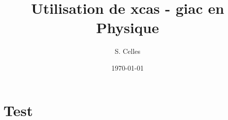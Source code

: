 \documentclass[a4paper,10pt]{book}
\title{Utilisation de xcas - giac en Physique}
\author{S. Celles}
\date{\today}
\begin{document}
\maketitle


\chapter{Test}
\end{document}
